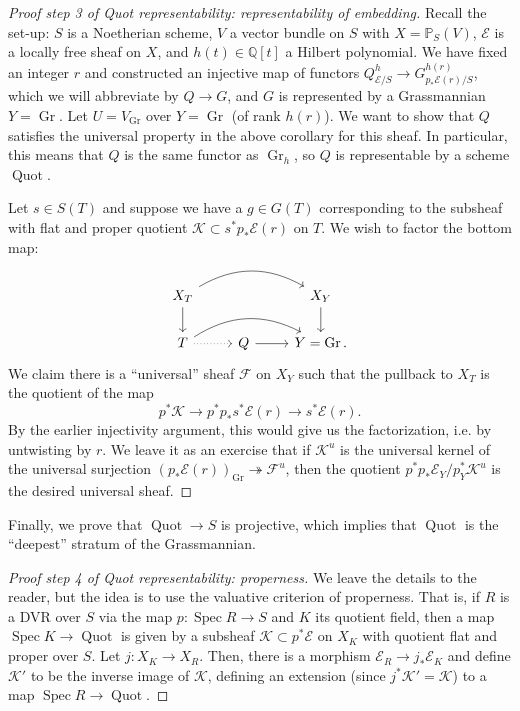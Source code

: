\documentclass[10pt]{article}
\theoremstyle{definition}
\DeclareMathOperator{\Spec}{Spec}
\DeclareMathOperator{\Quot}{Quot}
\newcommand{\PP}{\mathbb{P}}
\DeclareMathOperator{\Gr}{Gr}
\newcommand{\Q}{\mathbb{Q}}
\begin{document}
\begin{proof}[Proof step 3 of Quot representability: representability of embedding]
Recall the set-up: $S$ is a Noetherian scheme, $V$ a vector bundle on $S$ with $X = \PP_S(V)$, $\mathcal{E}$ is a locally free sheaf on $X$, and $h(t) \in \Q[t]$ a Hilbert polynomial.  We have fixed an integer $r$ and constructed an injective map of functors $Q^h_{\mathcal{E}/S} \rightarrow G^{h(r)}_{p_*\mathcal{E}(r)/S}$, which we will abbreviate by $Q \rightarrow G$, and $G$ is represented by a Grassmannian $Y = \Gr$.  Let $U = V_{\Gr}$ over $Y = \Gr$ (of rank $h(r)$).  We want to show that $Q$ satisfies the universal property in the above corollary for this sheaf.  In particular, this means that $Q$ is the same functor as $\Gr_h$, so $Q$ is representable by a scheme $\Quot$.

Let $s \in S(T)$ and suppose we have a $g \in G(T)$ corresponding to the subsheaf with flat and proper quotient $\mathcal{K} \subset s^*p_*\mathcal{E}(r)$ on $T$.  We wish to factor the bottom map:
$$\begin{tikzcd}
X_T \arrow[rr, bend left] \arrow[d] & & X_Y \arrow[d] \\
T \arrow[rr, bend left] \arrow[r, dotted] & Q \arrow[r] & Y = \Gr.
\end{tikzcd}$$
We claim there is a ``universal'' sheaf $\mathcal{F}$ on $X_Y$ such that the pullback to $X_T$ is the quotient of the map 
$$p^* \mathcal{K} \rightarrow p^* p_* s^*\mathcal{E}(r) \rightarrow s^* \mathcal{E}(r).$$
By the earlier injectivity argument, this would give us the factorization, i.e. by untwisting by $r$.  We leave it as an exercise that if $\mathcal{K}^u$ is the universal kernel of the universal surjection $(p_* \mathcal{E}(r))_{\Gr} \twoheadrightarrow \mathcal{F}^u$, then the quotient $p^* p_* \mathcal{E}_Y/p_Y^* \mathcal{K}^u$ is the desired universal sheaf.
\end{proof}




Finally, we prove that $\Quot \rightarrow S$ is projective, which implies that $\Quot$ is the ``deepest'' stratum of the Grassmannian.
\begin{proof}[Proof step 4 of Quot representability: properness]
We leave the details to the reader, but the idea is to use the valuative criterion of properness.  That is, if $R$ is a DVR over $S$ via the map $p: \Spec R \rightarrow S$ and $K$ its quotient field, then a map $\Spec K \rightarrow \Quot$ is given by a subsheaf $\mathcal{K} \subset p^* \mathcal{E}$ on $X_K$ with  quotient flat and proper over $S$.  Let $j: X_K \rightarrow X_R$.  Then, there is a morphism $\mathcal{E}_R \rightarrow j_*\mathcal{E}_K$ and define $\mathcal{K}'$ to be the inverse image of $\mathcal{K}$, defining an extension (since $j^* \mathcal{K}' = \mathcal{K}$) to a map $\Spec R \rightarrow \Quot$.
\end{proof}
\end{document}

